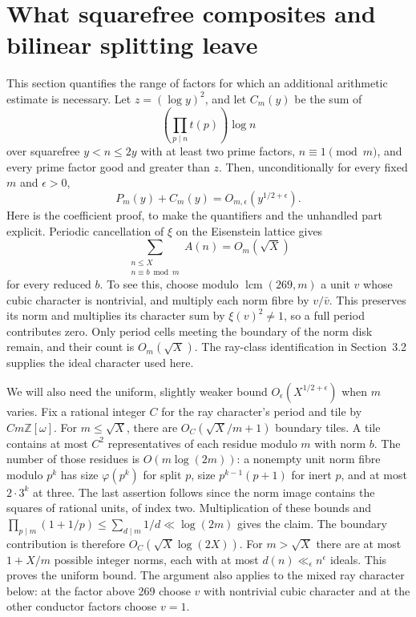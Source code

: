\documentclass[11pt]{article}
\newcommand{\Z}{\mathbb Z}
\begin{document}
\section{What squarefree composites and bilinear splitting leave}
This section quantifies the range of factors for which an additional arithmetic estimate is necessary.
Let $z=(\log y)^2$, and let $C_m(y)$ be the sum of
\[
 \left(\prod_{p\mid n}t(p)\right)\log n
\]
over squarefree $y<n\le2y$ with at least two prime factors, $n\equiv1\pmod m$, and every prime factor good and greater than $z$. Then, unconditionally for every fixed $m$ and $\epsilon>0$,
\[
 P_m(y)+C_m(y)=O_{m,\epsilon}(y^{1/2+\epsilon}).
 \tag{6.1}
\]
Here is the coefficient proof, to make the quantifiers and the unhandled part explicit. Periodic cancellation of $\xi$ on the Eisenstein lattice gives
\[
 \sum_{\substack{n\le X\\ n\equiv b\bmod m}}A(n)=O_m(\sqrt X)
 \tag{6.2}
\]
for every reduced $b$. To see this, choose modulo $\operatorname{lcm}(269,m)$ a unit $v$ whose cubic character is nontrivial, and multiply each norm fibre by $v/\bar v$. This preserves its norm and multiplies its character sum by $\xi(v)^2\ne1$, so a full period contributes zero. Only period cells meeting the boundary of the norm disk remain, and their count is $O_m(\sqrt X)$. The ray-class identification in Section~3.2 supplies the ideal character used here.

We will also need the uniform, slightly weaker bound $O_\epsilon(X^{1/2+\epsilon})$ when $m$ varies. Fix a rational integer $C$ for the ray character's period and tile by $Cm\Z[\omega]$. For $m\le\sqrt X$, there are $O_C(\sqrt X/m+1)$ boundary tiles. A tile contains at most $C^2$ representatives of each residue modulo $m$ with norm $b$. The number of those residues is $O(m\log(2m))$: a nonempty unit norm fibre modulo $p^k$ has size $\varphi(p^k)$ for split $p$, size $p^{k-1}(p+1)$ for inert $p$, and at most $2\cdot3^k$ at three. The last assertion follows since the norm image contains the squares of rational units, of index two. Multiplication of these bounds and $\prod_{p\mid m}(1+1/p)\le\sum_{d\mid m}1/d\ll\log(2m)$ gives the claim. The boundary contribution is therefore $O_C(\sqrt X\log(2X))$. For $m>\sqrt X$ there are at most $1+X/m$ possible integer norms, each with at most $d(n)\ll_\epsilon n^\epsilon$ ideals. This proves the uniform bound. The argument also applies to the mixed ray character below: at the factor above 269 choose $v$ with nontrivial cubic character and at the other conductor factors choose $v=1$.
\end{document}

